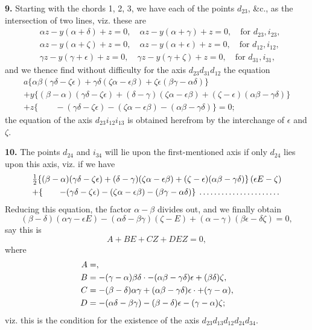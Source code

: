 \documentclass[11pt,a4paper]{book}
\begin{document}
\textbf{9.} Starting with the chords 1, 2, 3, we have each of the points $d_{23}$, \&c., as the intersection of two lines, viz. these are
\[
\begin{aligned}
&\alpha z - y(\alpha+\delta) + z = 0, \quad \alpha z - y(\alpha+\gamma) + z = 0, \quad \text{for } d_{23}, i_{23},\\
&\alpha z - y(\alpha+\zeta) + z = 0, \quad \alpha z - y(\alpha+\epsilon) + z = 0, \quad \text{for } d_{12}, i_{12},\\
&\gamma z - y(\gamma+\epsilon) + z = 0, \quad \gamma z - y(\gamma+\zeta) + z = 0, \quad \text{for } d_{31}, i_{31},
\end{aligned}
\]
and we thence find without difficulty for the axis $d_{23}d_{31}d_{12}$ the equation
\begin{multline*}
a\{\alpha\beta(\gamma\delta - \zeta\epsilon) + \gamma\delta(\zeta\alpha - \epsilon\beta) + \zeta\epsilon(\beta\gamma - \alpha\delta)\} \\
+ y\{(\beta-\alpha)(\gamma\delta - \zeta\epsilon) + (\delta-\gamma)(\zeta\alpha - \epsilon\beta) + (\zeta-\epsilon)(\alpha\beta - \gamma\delta)\} \\
+ z\{\quad\quad - (\gamma\delta - \zeta\epsilon) - (\zeta\alpha - \epsilon\beta) - (\alpha\beta - \gamma\delta)\} = 0;
\end{multline*}
the equation of the axis $d_{23}i_{12}i_{13}$ is obtained herefrom by the interchange of $\epsilon$ and $\zeta$.

\textbf{10.} The points $d_{24}$ and $i_{34}$ will lie upon the first-mentioned axis if only $d_{24}$ lies upon this axis, viz. if we have
\begin{multline*}
\tfrac{1}{2}\{(\beta-\alpha)(\gamma\delta - \zeta\epsilon) + (\delta-\gamma)(\zeta\alpha - \epsilon\beta) + (\zeta-\epsilon)(\alpha\beta - \gamma\delta)\}\,(\epsilon E - \zeta) \\
+ \{\quad\quad - (\gamma\delta - \zeta\epsilon) - (\zeta\alpha - \epsilon\beta) - (\beta\gamma - \alpha\delta)\}\,\dotfill
\end{multline*}
Reducing this equation, the factor $\alpha - \beta$ divides out, and we finally obtain
\[
(\beta-\delta)(\alpha\gamma - \epsilon E) - (\alpha\delta - \beta\gamma)(\zeta - E) + (\alpha-\gamma)(\beta\epsilon - \delta\zeta) = 0,
\]
say this is
\[ A + BE + CZ + DEZ = 0, \]
where
\[
\begin{aligned}
A &= \dotfill, \\
B &= -(\gamma-\alpha)\beta\delta \cdot -(\alpha\beta - \gamma\delta)\epsilon + (\beta\delta)\zeta, \\
C &= -(\beta-\delta)\alpha\gamma + (\alpha\beta - \gamma\delta)\epsilon \cdot \dotfill + (\gamma-\alpha)\dotfill, \\
D &= -(\alpha\delta - \beta\gamma) - (\beta-\delta)\epsilon - (\gamma-\alpha)\zeta;
\end{aligned}
\]
viz. this is the condition for the existence of the axis $d_{23}d_{13}d_{12}d_{24}d_{34}$.
\end{document}
